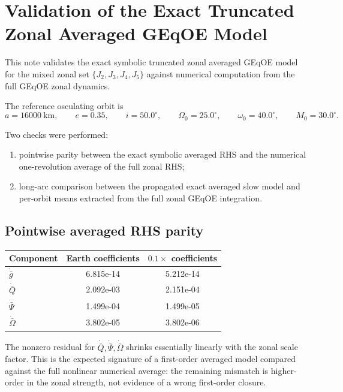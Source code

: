 \documentclass[11pt]{article}
\begin{document}
\section*{Validation of the Exact Truncated Zonal Averaged GEqOE Model}

This note validates the exact symbolic truncated zonal averaged GEqOE model for
the mixed zonal set $\{J_2, J_3, J_4, J_5\}$ against numerical computation from the full
GEqOE zonal dynamics.

The reference osculating orbit is
\[
a=16000\ \mathrm{km},\qquad
e=0.35,\qquad
i=50.0^\circ,\qquad
\Omega_0=25.0^\circ,\qquad
\omega_0=40.0^\circ,\qquad
M_0=30.0^\circ.
\]

Two checks were performed:
\begin{enumerate}
\item pointwise parity between the exact symbolic averaged RHS and the
numerical one-revolution average of the full zonal RHS;
\item long-arc comparison between the propagated exact averaged slow model and
per-orbit means extracted from the full zonal GEqOE integration.
\end{enumerate}

\subsection*{Pointwise averaged RHS parity}
\begin{center}
\begin{tabular}{lcc}
\toprule
Component & Earth coefficients & $0.1\times$ coefficients \\
\midrule
$\dot{\bar g}$ & 6.815e-14 & 5.212e-14 \\
$\dot{\bar Q}$ & 2.092e-03 & 2.151e-04 \\
$\dot{\bar\Psi}$ & 1.499e-04 & 1.499e-05 \\
$\dot{\bar\Omega}$ & 3.802e-05 & 3.802e-06 \\
\bottomrule
\end{tabular}
\end{center}

The nonzero residual for $\dot{\bar Q}, \dot{\bar\Psi}, \dot{\bar\Omega}$
shrinks essentially linearly with the zonal scale factor. This is the expected
signature of a first-order averaged model compared against the full nonlinear
numerical average: the remaining mismatch is higher-order in the zonal
strength, not evidence of a wrong first-order closure.
\end{document}
